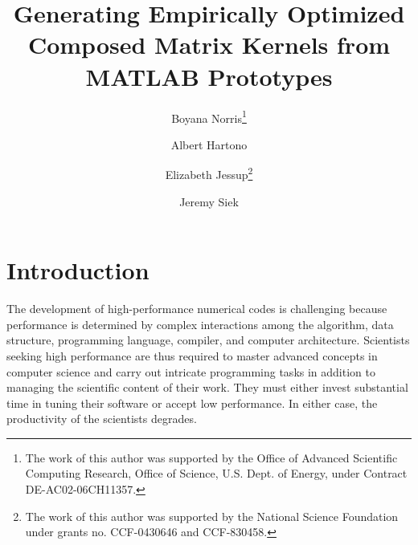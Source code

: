 \documentclass[runningheads]{llncs}
\begin{document}
\mainmatter  %

\title{Generating Empirically Optimized Composed Matrix Kernels from MATLAB Prototypes}


\author{Boyana Norris\thanks{The work of this author was supported by the Office of Advanced Scientific Computing Research, Office of Science, U.S. Dept. of Energy, under Contract DE-AC02-06CH11357.}
  \and Albert Hartono
  \and Elizabeth Jessup\thanks{The work of this author was supported by the
  National Science Foundation under grants no. CCF-0430646 and CCF-830458.}
  \and Jeremy Siek
%
%
}

\maketitle



\section{Introduction}
\label{sec:intro}

The development of high-performance numerical codes is challenging because
performance is determined by complex interactions among the algorithm, data
structure, programming language, compiler, and computer
architecture. Scientists seeking high performance are thus required to master
advanced concepts in computer science and carry out intricate programming
tasks in addition to managing the scientific content of their work.  They
must either invest substantial time in tuning their software or accept low
performance. In either case, the productivity of the scientists degrades.
\end{document}
